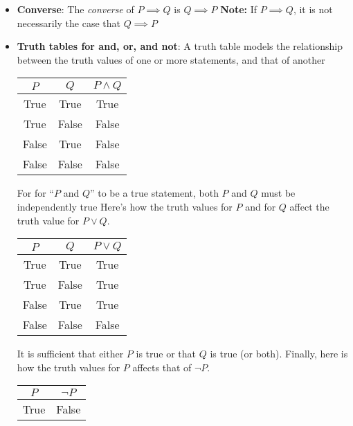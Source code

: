 \documentclass{report}
\begin{document}
\begin{itemize}
        \item \textbf{Converse}: The \textit{converse} of $P \implies Q$ is $Q\implies P $
            \bigbreak \noindent 
            \textbf{Note:} If $P \implies Q$, it is not necessarily the case that $Q \implies P$
        \item \textbf{Truth tables for and, or, and not}: A truth table models the relationship between the truth values of one or more statements, and that of another
            \bigbreak \noindent 
            \begin{center}
                \begin{tabular}{c|c|c}
                    $P$& $Q$ & $P\land Q$ \\
                    \hline
                    True & True  & True \\
                    True & False & False \\
                    False &  True & False \\
                    False & False & False
                \end{tabular}
            \end{center}
            For for “$P$ and $Q$” to be a true statement, both $P$ and $Q$ must be independently true
            \bigbreak \noindent 
            Here’s how the truth values for $P$ and for $Q$ affect the truth value for $P \lor Q$.
            \begin{center}
                \begin{tabular}{c|c|c}
                    $P$ & $Q$ & $P \lor Q$ \\
                    \hline
                    True  & True & True \\
                    True  & False & True \\
                    False  & True  & True \\
                    False & False & False
                \end{tabular}
            \end{center}
            It is sufficient that either $P$ is true or that $Q$ is true (or both).
            \bigbreak \noindent 
            Finally, here is how the truth values for $P$ affects that of $\neg P$.
            \begin{center}
                \begin{tabular}{c|c}
                    $P$ &  $\neg P$ \\
                    \hline
                    True & False\\

\end{tabular}
\end{center}
\end{itemize}
\end{document}
